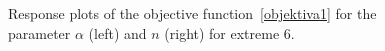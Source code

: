 \documentclass[review,times,3p,twocolumn,10pt]{elsarticle}
\begin{document}
\begin{figure}
\caption{Response plots of the objective function~\eqref{objektiva1} for the parameter $\alpha$ (left) and $n$ (right) for extreme 6.}
\label{objfnc6}
\end{figure}
\end{document}
